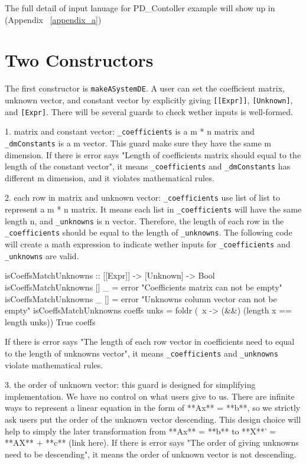 The full detail of input lanuage for PD\_Contoller example will show up in (Appendix ~\ref{appendix_a})

\section{Two Constructors}
The first constructor is \verb|makeASystemDE|. A user can set the coefficient matrix, unknown vector, and constant vector by explicitly giving \verb|[[Expr]]|, \verb|[Unknown]|, and \verb|[Expr]|. There will be several guards to check wether inputs is well-formed.

1. matrix and constant vector: \verb|_coefficients| is a m * n matrix and \verb|_dmConstants| is a m vector. This guard make sure they have the same m dimension. If there is error says "Length of coefficients matrix should equal to the length of the constant vector", it means \verb|_coefficients| and \verb|_dmConstants| has different m dimension, and it violates mathematical rules.

2. each row in matrix and unknown vector: \verb|_coefficients| use list of list to represent a m * n matrix. It means each list in \verb|_coefficients| will have the same length n, and \verb|_unknowns| is n vector. Therefore, the length of each row in the \verb|_coefficients| should be equal to the length of \verb|_unknowns|. The following code will create a math expression to indicate wether inputs for \verb|_coefficients| and \verb|_unknowns| are valid.

\begin{haskell1}
isCoeffsMatchUnknowns :: [[Expr]] -> [Unknown] -> Bool
isCoeffsMatchUnknowns [] _ = error "Coefficients matrix can not be empty"
isCoeffsMatchUnknowns _ [] = error "Unknowns column vector can not be empty"
isCoeffsMatchUnknowns coeffs unks = foldr (\ x -> (&&) (length x == length unks)) True coeffs
\end{haskell1}

If there is error says "The length of each row vector in coefficients need to equal to the length of unknowns vector", it means \verb|_coefficients| and \verb|_unknowns| violate mathematical rules.

3. the order of unknown vector: this guard is designed for simplifying implementation. We have no control on what users give to us. There are infinite ways to represent a linear equation in the form of **Ax** = **b**, so we strictly ask users put the order of the unknown vector descending. This design choice will help to simply the later transformation from **Ax** = **b** to **X**' = **AX** + **c** (link here). If there is error says "The order of giving unknowns need to be descending", it means the order of unknown vector is not descending.

